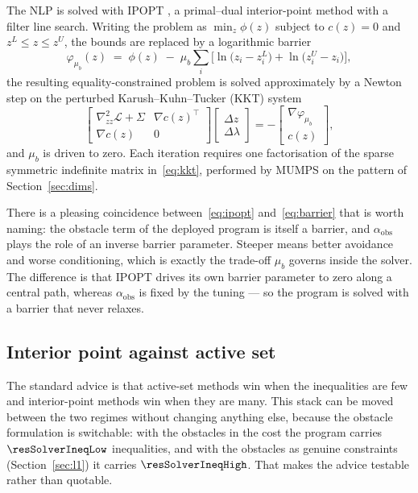 \documentclass[11pt,a4paper]{article}
\newcommand{\aobs}{\alpha_{\mathrm{obs}}}
\begin{document}
The NLP is solved with IPOPT \cite{wachter2006ipopt}, a primal--dual interior-point method with a filter
line search. Writing the problem as $\min_z \phi(z)$ subject to $c(z)=0$ and $z^L\le z\le z^U$, the bounds
are replaced by a logarithmic barrier
\begin{equation}
  \varphi_{\mu_b}(z) \;=\; \phi(z) \;-\; \mu_b\sum_i\Big[\ln\!\big(z_i-z_i^L\big)+\ln\!\big(z_i^U-z_i\big)\Big],
  \label{eq:ipopt}
\end{equation}
the resulting equality-constrained problem is solved approximately by a Newton step on the perturbed Karush--Kuhn--Tucker (KKT)
system
\begin{equation}
  \begin{bmatrix}
    \nabla^2_{zz}\mathcal{L} + \Sigma & \nabla c(z)^{\!\top}\\
    \nabla c(z) & 0
  \end{bmatrix}
  \begin{bmatrix}\Delta z\\ \Delta\lambda\end{bmatrix}
  = -\begin{bmatrix}\nabla\varphi_{\mu_b}\\ c(z)\end{bmatrix},
  \label{eq:kkt}
\end{equation}
and $\mu_b$ is driven to zero. Each iteration requires one factorisation of the sparse symmetric indefinite
matrix in~\eqref{eq:kkt}, performed by MUMPS on the pattern of Section~\ref{sec:dims}.

There is a pleasing coincidence between~\eqref{eq:ipopt} and~\eqref{eq:barrier} that is worth naming: the
obstacle term of the deployed program is itself a barrier, and $\aobs$ plays the role of an inverse barrier
parameter. Steeper means better avoidance and worse conditioning, which is exactly the trade-off $\mu_b$
governs inside the solver. The difference is that IPOPT drives its own barrier parameter to zero along a
central path, whereas $\aobs$ is fixed by the tuning --- so the program is solved with a barrier that never
relaxes.

\subsection{Interior point against active set}
\label{sec:solvercmp}

The standard advice is that active-set methods win when the inequalities are few and interior-point methods
win when they are many. This stack can be moved between the two regimes without changing anything else,
because the obstacle formulation is switchable: with the obstacles in the cost the program carries
$\resSolverIneqLow$ inequalities, and with the obstacles as genuine constraints (Section~\ref{sec:l1}) it
carries $\resSolverIneqHigh$. That makes the advice testable rather than quotable.
\end{document}

